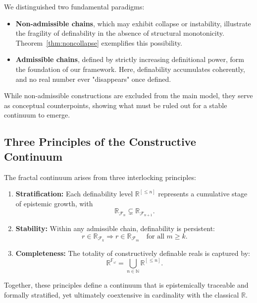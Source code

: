 \documentclass[12pt]{article}
\theoremstyle{definition}
\theoremstyle{plain}
\theoremstyle{remark}
\begin{document}
We distinguished two fundamental paradigms:

\begin{itemize}
    \item \textbf{Non-admissible chains}, which may exhibit collapse or instability, illustrate the fragility of definability in the absence of structural monotonicity. Theorem~\ref{thm:noncollapse} exemplifies this possibility.
    
    \item \textbf{Admissible chains}, defined by strictly increasing definitional power, form the foundation of our framework. Here, definability accumulates coherently, and no real number ever "disappears" once defined.
\end{itemize}

While non-admissible constructions are excluded from the main model, they serve as conceptual counterpoints, showing what must be ruled out for a stable continuum to emerge.

\subsection*{Three Principles of the Constructive Continuum}

The fractal continuum arises from three interlocking principles:

\begin{enumerate}
    \item \textbf{Stratification:} Each definability level \( \mathbb{R}^{[\leq n]} \) represents a cumulative stage of epistemic growth, with
    \[
        \mathbb{R}_{\mathcal{F}_n} \subsetneq \mathbb{R}_{\mathcal{F}_{n+1}}.
    \]

    \item \textbf{Stability:} Within any admissible chain, definability is persistent:
    \[
        r \in \mathbb{R}_{\mathcal{F}_k} \Rightarrow r \in \mathbb{R}_{\mathcal{F}_m} \quad \text{for all } m \geq k.
    \]

    \item \textbf{Completeness:} The totality of constructively definable reals is captured by:
    \[
        \mathbb{R}^{\mathbb{F}_\omega} = \bigcup_{n \in \mathbb{N}} \mathbb{R}^{[\leq n]}.
    \]
\end{enumerate}

Together, these principles define a continuum that is epistemically traceable and formally stratified, yet ultimately coextensive in cardinality with the classical \( \mathbb{R} \).
\end{document}

